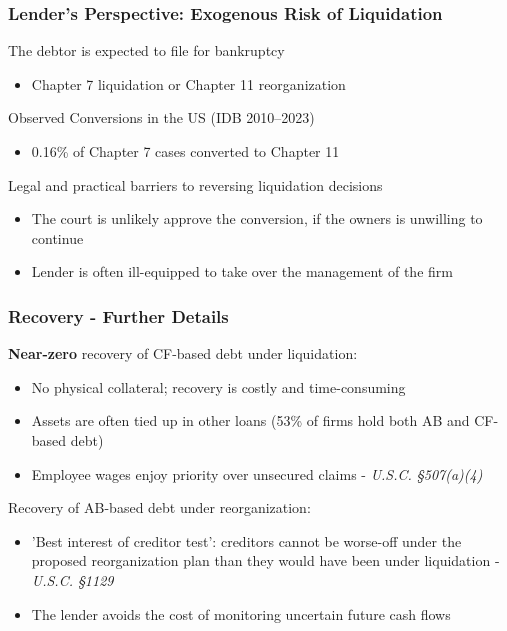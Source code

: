 \documentclass[aspectratio=169,xcolor=table]{beamer}
\begin{document}
\begin{frame}[label = Conversions] \frametitle{Lender's Perspective: Exogenous Risk of Liquidation \hfill  \hyperlink{motivation2}{}}

The debtor is expected to file for bankruptcy
\begin{itemize} \small 
    \item Chapter 7 liquidation or Chapter 11 reorganization
\end{itemize} \normalsize \vspace{6mm} 

Observed Conversions in the US (IDB 2010–2023)
\begin{itemize} \small 
    \item 0.16\% of Chapter 7 cases converted to Chapter 11
\end{itemize} \normalsize  \vspace{6mm}

Legal and practical barriers to reversing liquidation decisions
\begin{itemize} \small
    \item The court is unlikely approve the conversion, if the owners is unwilling to continue 
    \item Lender is often ill-equipped to take over the management of the firm
\end{itemize} \normalsize


\end{frame}



\begin{frame}[label = payoffs_det] \frametitle{Recovery - Further Details \hfill  \hyperlink{payoffs}{}}

\textbf{Near-zero} recovery of CF-based debt under liquidation: 
\begin{itemize} \small
    \item No physical collateral; recovery is costly and time-consuming
    \item Assets are often tied up in other loans (53\% of firms hold both AB and CF-based debt)
    \item Employee wages enjoy priority over unsecured claims - \textit{U.S.C. §507(a)(4)}
\end{itemize} \normalsize \vspace{5mm}

Recovery of AB-based debt under reorganization: 
\begin{itemize} \small
    \item 'Best interest of creditor test': creditors cannot be worse-off under the proposed reorganization plan than they would have been under liquidation - \textit{U.S.C. §1129}
    \item The lender avoids the cost of monitoring uncertain future cash flows
\end{itemize} \normalsize
 \normalsize 


\end{frame}
\end{document}
